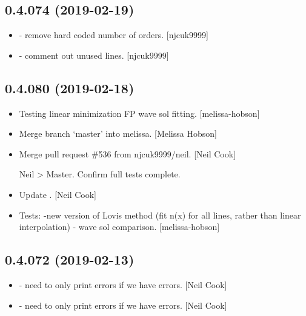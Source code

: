 \documentclass[a4paper,10pt,english]{report}
\begin{document}
\subsection{0.4.074 (2019-02-19)}
\label{\detokenize{misc/changelog:id184}}\begin{itemize}
\item {} 
 - remove hard coded number of orders. {[}njcuk9999{]}

\item {} 
 - comment out unused lines. {[}njcuk9999{]}

\end{itemize}


\subsection{0.4.080 (2019-02-18)}
\label{\detokenize{misc/changelog:id185}}\begin{itemize}
\item {} 
Testing linear minimization FP wave sol fitting. {[}melissa-hobson{]}

\item {} 
Merge branch ‘master’ into melissa. {[}Melissa Hobson{]}

\item {} 
Merge pull request \#536 from njcuk9999/neil. {[}Neil Cook{]}

Neil \textendash{}\textgreater{} Master. Confirm full tests complete.

\item {} 
Update . {[}Neil Cook{]}

\item {} 
Tests: -new version of Lovis method (fit n(x) for all lines, rather
than linear interpolation) - wave sol comparison. {[}melissa-hobson{]}

\end{itemize}


\subsection{0.4.072 (2019-02-13)}
\label{\detokenize{misc/changelog:id186}}\begin{itemize}
\item {} 
 - need to only print errors if we have errors.
{[}Neil Cook{]}

\item {} 
 - need to only print errors if we have errors.
{[}Neil Cook{]}

\end{itemize}
\end{document}
